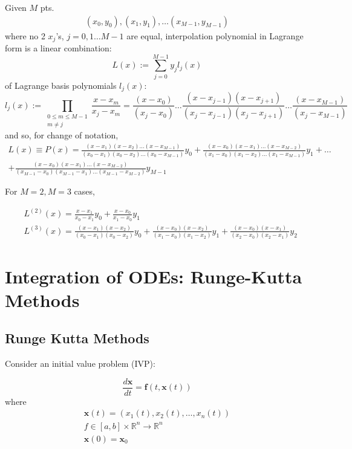 \documentclass[10pt]{amsart}
\begin{document}
\begin{multicols*}{2}
Given $M$ pts.
\[
\begin{gathered}
	(x_0, y_0), (x_1, y_1), \dots (x_{M - 1}, y_{M- 1})
\end{gathered}
\]
where no 2 $x_j$'s, $j= 0, 1 \dots M-1$ are equal, interpolation polynomial in Lagrange form is a linear combination:
\begin{equation}
	L(x) := \sum_{j=0}^{M- 1} y_j l_j(x)
\end{equation}
of Lagrange basis polynomials $l_j(x)$:
\begin{equation}
	l_j(x) := \prod_{ \substack{ 0 \leq m \leq M - 1 \\ m \neq j } } \frac{ x - x_m}{ x_j - x_m } = \frac{ (x- x_0) }{ (x_j - x_0) } \dots \frac{ (x- x_{j-1}) ( x - x_{j+1} ) }{ (x_j - x_{j-1} ) ( x_j - x_{j+1} ) } \dots \frac{ (x- x_{M-1}) }{ (x_j - x_{M- 1})}
\end{equation}
and so, for change of notation,
\[
\begin{gathered}
	L(x) \equiv P(x) = \frac{ (x-x_1) (x-x_2) \dots (x-x_{M-1} ) }{ (x_0 - x_1) (x_0 - x_2) \dots (x_0 - x_{M-1})} y_0 + \frac{ (x-x_0) (x-x_1) \dots (x-x_{M-2} ) }{ (x_1 - x_0) (x_1 - x_2) \dots (x_1 - x_{M-1})} y_1 + \dots \\
	+ \frac{ (x-x_0) (x-x_1) \dots (x-x_{M-2} ) }{ (x_{M-1} - x_0) (x_{M-1} - x_1) \dots (x_{M-1} - x_{M-2})} y_{M - 1}
\end{gathered}
\]

For $M=2, M=3$ cases,

\[
\begin{aligned}
	& L^{(2)}(x) = \frac{ x - x_1}{x_0 - x_1} y_0 + \frac{ x- x_0 }{ x_1 - x_0} y_1 \\
	& L^{(3)}(x) = \frac{ (x - x_1)(x - x_2) }{ (x_0 - x_1) (x_0 - x_2) } y_0 + \frac{ (x - x_0)(x - x_2) }{ (x_1 - x_0) (x_1 - x_2) } y_1 + \frac{ (x- x_0)( x- x_1) }{ (x_2 - x_0)(x_2 - x_1)} y_2
\end{aligned}
\]


\section{Integration of ODEs: Runge-Kutta Methods}

\subsection{Runge Kutta Methods}

Consider an initial value problem (IVP):

\begin{equation}
	\frac{d\mathbf{x}}{dt} = \mathbf{f}(t, \mathbf{x}(t)) 
\end{equation}
where
\[
\begin{gathered}
	\mathbf{x}(t) = (x_1(t), x_2(t), \dots, x_n(t)) \\
	f\in [a,b] \times \mathbb{R}^n \to \mathbb{R}^n \\
	\mathbf{x}(0) = \mathbf{x}_0
\end{gathered}
\]


\end{multicols*}
\end{document}
